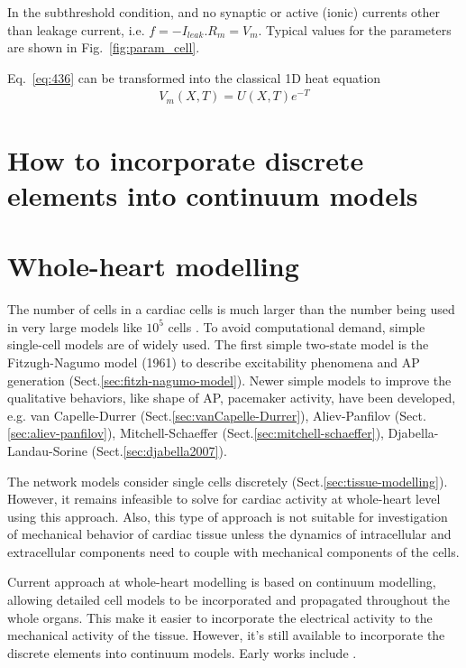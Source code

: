 In the subthreshold condition, and no synaptic or active (ionic)
currents other than leakage current,
i.e. $f=-I_{leak}.R_m=V_m$. Typical values for the parameters are
shown in Fig.~\ref{fig:param_cell}.


Eq.~\eqref{eq:436} can be transformed into the classical 1D heat
equation
\begin{eqnarray}
  \label{eq:562}
  V_m(X,T) = U(X,T) e^{-T}
\end{eqnarray}





\section{How to incorporate discrete elements into continuum models}



\section{Whole-heart modelling}
\label{sec:whole-heart-modelling}

The number of cells in a cardiac cells is much larger than the number being used
in very large models like $10^5$ cells \citep{muller-borrer1994}. To avoid
computational demand, simple single-cell models are of widely used.
The first simple two-state model is the Fitzugh-Nagumo model (1961) to describe
excitability phenomena and AP generation (Sect.\ref{sec:fitzh-nagumo-model}).
Newer simple models to improve the qualitative behaviors, like shape of AP,
pacemaker activity, have been developed, e.g. van Capelle-Durrer
(Sect.\ref{sec:vanCapelle-Durrer}), Aliev-Panfilov
(Sect.\ref{sec:aliev-panfilov}), Mitchell-Schaeffer
(Sect.\ref{sec:mitchell-schaeffer}), Djabella-Landau-Sorine
(Sect.\ref{sec:djabella2007}).
 
The network models consider single cells discretely
(Sect.\ref{sec:tissue-modelling}). However, it remains infeasible to solve for
cardiac activity at whole-heart level using this approach. Also, this type of
approach is not suitable for investigation of mechanical behavior of cardiac
tissue unless the dynamics of intracellular and extracellular components need to
couple with mechanical components of the cells.

Current approach at whole-heart modelling is based on continuum modelling,
allowing detailed cell models to be incorporated and propagated throughout the
whole organs. This make it easier to incorporate the electrical activity to the
mechanical activity of the tissue. However, it's still available to incorporate
the discrete elements into continuum models.
Early works include \citep{leGrice1992}.   


